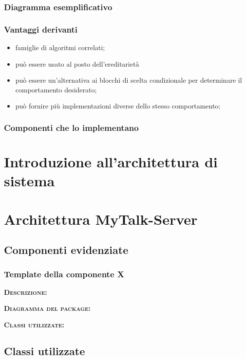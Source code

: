 \subsubsection{Diagramma esemplificativo}
\subsubsection{Vantaggi derivanti}
\begin{itemize}
\item famiglie di algoritmi correlati;
\item può essere usato al posto dell'ereditarietà
\item può essere un'alternativa ai blocchi di scelta condizionale per determinare il comportamento desiderato;
\item può fornire più implementazioni diverse dello stesso comportamento;
\end{itemize}
\subsubsection{Componenti che lo implementano}

\clearpage
\section{Introduzione all'architettura di sistema}

\clearpage
\section{Architettura MyTalk-Server}

\subsection{Componenti evidenziate}

\subsubsection{Template della componente X}
\begin{description}
	\item{\scshape\bfseries Descrizione:} 
	\item{\scshape\bfseries Diagramma del package:}
	\item{\scshape\bfseries Classi utilizzate:} 
\end{description}

\subsection{Classi utilizzate}


